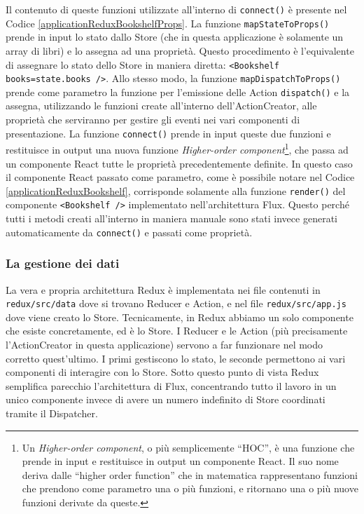 Il contenuto di queste funzioni utilizzate all'interno di \texttt{connect()} è presente nel Codice \ref{applicationReduxBookshelfProps}. La funzione \texttt{mapStateToProps()} prende in input lo stato dallo Store (che in questa applicazione è solamente un array di libri) e lo assegna ad una proprietà. Questo procedimento è l'equivalente di assegnare lo stato dello Store in maniera diretta: \texttt{<Bookshelf books={state.books} />}.
Allo stesso modo, la funzione \texttt{mapDispatchToProps()} prende come parametro la funzione per l'emissione delle Action \texttt{dispatch()} e la assegna, utilizzando le funzioni create all'interno dell'ActionCreator, alle proprietà che serviranno per gestire gli eventi nei vari componenti di presentazione.
La funzione \texttt{connect()} prende in input queste due funzioni e restituisce in output una nuova funzione \textit{Higher-order component}\footnote{Un \textit{Higher-order component}, o più semplicemente “HOC”, è una funzione che prende in input e restituisce in output un componente React. Il suo nome deriva dalle “higher order function” che in matematica rappresentano funzioni che prendono come parametro una o più funzioni, e ritornano una o più nuove funzioni derivate da queste.}, che passa ad un componente React tutte le proprietà precedentemente definite. In questo caso il componente React passato come parametro, come è possibile notare nel Codice \ref{applicationReduxBookshelf}, corrisponde solamente alla funzione \texttt{render()} del componente \texttt{<Bookshelf />} implementato nell'architettura Flux. Questo perché tutti i metodi creati all'interno in maniera manuale sono stati invece generati automaticamente da \texttt{connect()} e passati come proprietà.
 
\subsubsection*{La gestione dei dati}
La vera e propria architettura Redux è implementata nei file contenuti in \texttt{redux/src/data} dove si trovano Reducer e Action, e nel file \texttt{redux/src/app.js} dove viene creato lo Store. Tecnicamente, in Redux abbiamo un solo componente che esiste concretamente, ed è lo Store. I Reducer e le Action (più precisamente l'ActionCreator in questa applicazione) servono a far funzionare nel modo corretto quest'ultimo. I primi gestiscono lo stato, le seconde permettono ai vari componenti di interagire con lo Store.
Sotto questo punto di vista Redux semplifica parecchio l'architettura di Flux, concentrando tutto il lavoro in un unico componente invece di avere un numero indefinito di Store coordinati tramite il Dispatcher.


